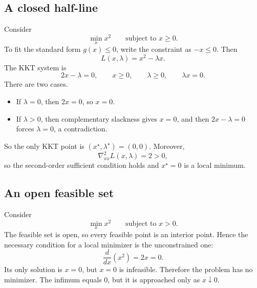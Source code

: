 \subsection{A closed half-line}
\begin{example}[Minimizing on $x\ge 0$]
\label{ex:ch7-half-line}
Consider
\[
  \min_x x^2
  \qquad \text{subject to } x\ge 0.
\]
To fit the standard form $g(x)\le 0$, write the constraint as $-x\le 0$.
Then
\[
  L(x,\lambda)=x^2-\lambda x.
\]
The KKT system is
\[
  2x-\lambda=0,
  \qquad
  x\ge 0,
  \qquad
  \lambda\ge 0,
  \qquad
  \lambda x=0.
\]
There are two cases.
\begin{itemize}
  \item If $\lambda=0$, then $2x=0$, so $x=0$.
  \item If $\lambda>0$, then complementary slackness gives $x=0$, and then
  $2x-\lambda=0$ forces $\lambda=0$, a contradiction.
\end{itemize}
So the only KKT point is $(x^\star,\lambda^\star)=(0,0)$. Moreover,
\[
  \nabla_{xx}^2 L(x,\lambda)=2>0,
\]
so the second-order sufficient condition holds and $x^\star=0$ is a local
minimum.
\end{example}

\subsection{An open feasible set}
\begin{example}
\label{ex:ch7-open-set}
Consider
\[
  \min_x x^2
  \qquad \text{subject to } x>0.
\]
The feasible set is open, so every feasible point is an interior point. Hence
the necessary condition for a local minimizer is the unconstrained one:
\[
  \frac{d}{dx}(x^2)=2x=0.
\]
Its only solution is $x=0$, but $x=0$ is infeasible. Therefore the problem has
no minimizer. The infimum equals $0$, but it is approached only as
$x\downarrow 0$.
\end{example}

